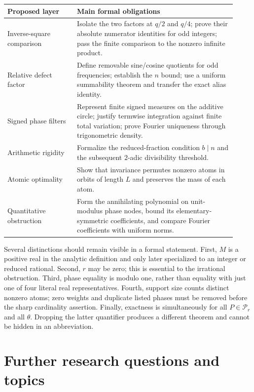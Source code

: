 \documentclass[11pt,a4paper]{article}
\numberwithin{equation}{section}
\theoremstyle{definition}
\theoremstyle{remark}
\newcommand{\Pol}{\mathcal P}\newcommand{\norm}[1]{\left\lVert#1\right\rVert}
\begin{document}
\begin{center}
\begin{tabular}{p{0.28\linewidth}p{0.64\linewidth}}
\toprule
Proposed layer & Main formal obligations\\
\midrule
Inverse-square comparison & Isolate the two factors at $q/2$ and $q/4$;
prove their absolute numerator identities for odd integers; pass the finite
comparison to the nonzero infinite product.\\[4pt]
Relative defect factor & Define removable sine/cosine quotients for odd
frequencies; establish the $n$ bound; use a uniform summability theorem
and transfer the exact alias identity.\\[4pt]
Signed phase filters & Represent finite signed measures on the additive
circle; justify termwise integration against finite total variation;
prove Fourier uniqueness through trigonometric density.\\[4pt]
Arithmetic rigidity & Formalize the reduced-fraction condition
$b\mid n$ and the subsequent $2$-adic divisibility threshold.\\[4pt]
Atomic optimality & Show that invariance permutes nonzero atoms in
orbits of length $L$ and preserves the mass of each atom.\\[4pt]
Quantitative obstruction & Form the annihilating polynomial on unit-modulus
phase nodes, bound its elementary-symmetric coefficients, and compare
Fourier coefficients with uniform norms.\\
\bottomrule
\end{tabular}
\end{center}

Several distinctions should remain visible in a formal statement.
First, $M$ is a positive real in the analytic definition and only later
specialized to an integer or reduced rational. Second, $r$ may be zero;
this is essential to the irrational obstruction. Third, phase equality
is modulo one, rather than equality with just one of four literal real
representatives. Fourth, support size counts distinct nonzero atoms;
zero weights and duplicate listed phases must be removed before the
sharp cardinality assertion. Finally, exactness is simultaneously for
all $P\in\Pol_r$ and all $\theta$. Dropping the latter quantifier
produces a different theorem and cannot be hidden in an abbreviation.

\section{Further research questions and topics}
\end{document}
